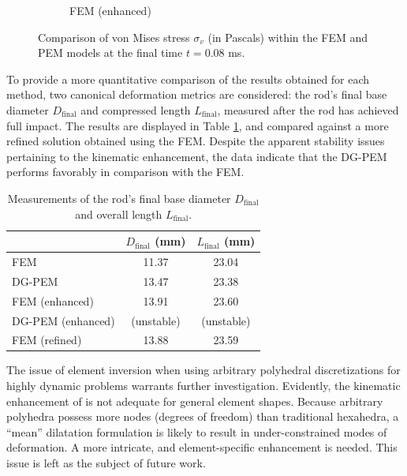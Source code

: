 \begin{figure}[!h]
\begin{subfigure}[b]{0.32\linewidth}
    			\caption{FEM (enhanced) \label{fig:taylor_bar_fem_fbar}}
    \end{subfigure} 
    \caption{Comparison of von Mises stress $\sigma_v$ (in Pascals) within the FEM and PEM models at the final time $t = 0.08$ ms.}
  \label{fig:taylor_bar_stresses}
\end{figure}

To provide a more quantitative comparison of the results obtained for each method, two canonical deformation metrics are considered: the rod's final base diameter $D_{\text{final}}$ and compressed length $L_{\text{final}}$, measured after the rod has achieved full impact. The results are displayed in Table \ref{tab:change_in_length_measurements}, and compared against a more refined solution obtained using the FEM. Despite the apparent stability issues pertaining to the kinematic enhancement, the data indicate that the DG-PEM performs favorably in comparison with the FEM.

\begin{table}[!ht]
  \begin{center}
    \begin{tabular}{| l || c | c |}
    \hline
                & $D_{\text{final}}$ (mm) & $L_{\text{final}}$ (mm) \\ \hline \hline
    FEM               & 11.37 & 23.04 \\ \hline
    DG-PEM            & 13.47 & 23.38 \\ \hline
    FEM (enhanced)    & 13.91 & 23.60 \\ \hline
    DG-PEM (enhanced) & (unstable) & (unstable) \\ \hline
    FEM (refined)     & 13.88 & 23.59 \\
    \hline
    \end{tabular}
    \caption{Measurements of the rod's final base diameter $D_{\text{final}}$ and overall length $L_{\text{final}}$.}
    \vspace{-5pt}
    \label{tab:change_in_length_measurements}
    \vspace{-10pt}
  \end{center}
\end{table}

The issue of element inversion when using arbitrary polyhedral discretizations for highly dynamic problems warrants further investigation. Evidently, the kinematic enhancement of \cite{Rashid:06} is not adequate for general element shapes. Because arbitrary polyhedra possess more nodes (degrees of freedom) than traditional hexahedra, a ``mean'' dilatation formulation is likely to result in under-constrained modes of deformation. A more intricate, and element-specific enhancement is needed. This issue is left as the subject of future work.